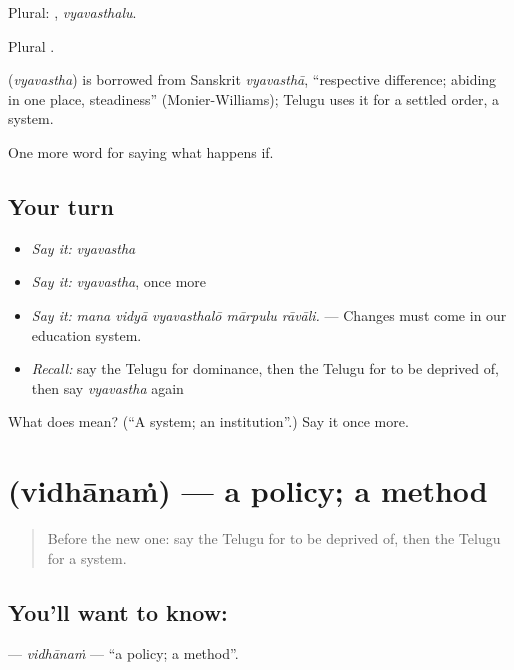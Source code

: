 Plural: , \emph{vyavasthalu}.

Plural .

\begin{cousinweb}
\textbf{} (\emph{vyavastha}) is borrowed from Sanskrit \emph{vyavasthā}, \textquotedblleft{}respective difference; abiding in one place, steadiness\textquotedblright{} (Monier-Williams); Telugu uses it for a settled order, a system.
\end{cousinweb}

\begin{grammarlens}[title={What you've built}]
One more word for saying what happens if.
\end{grammarlens}

\subsection*{Your turn}
\begin{itemize}
\raggedright
  \item \emph{Say it:} \emph{vyavastha}
  \item \emph{Say it:} \emph{vyavastha}, once more
  \item \emph{Say it:} \emph{mana vidyā vyavasthalō mārpulu rāvāli.} — Changes must come in our education system.
  \item \emph{Recall:} say the Telugu for dominance, then the Telugu for to be deprived of, then say \emph{vyavastha} again
\end{itemize}

\begin{tcolorbox}[breakable,colback=teal!4,colframe=teal!35!black,title={Before you move on}]
What does  mean? (\textquotedblleft{}A system; an institution\textquotedblright{}.) Say it once more.
\end{tcolorbox}
\section[\texorpdfstring{\te{విధానం} (vidhānaṁ)}{విధానం (vidhānaṁ)}]{ (vidhānaṁ) — a policy; a method}

\label{lesson:TE-C434-vidhanam}



\begin{quote}
Before the new one: say the Telugu for to be deprived of, then the Telugu for a system.
\end{quote}

\subsection*{You'll want to know: }
\textbf{} — \emph{vidhānaṁ} — \textquotedblleft{}a policy; a method\textquotedblright{}.

